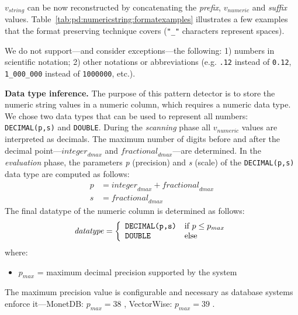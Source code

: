 \(v_{string}\) can be now reconstructed by concatenating the \textit{prefix}, \(v_{numeric}\) and \textit{suffix} values. Table~\ref{tab:pd:numericstring:formatexamples} illustrates a few examples that the format preserving technique covers (\verb|"_"| characters represent spaces).



We do not support---and consider exceptions---the following: 1) numbers in scientific notation; 2) other notations or abbreviations (e.g. \verb|.12| instead of \verb|0.12|, \verb|1_000_000| instead of \verb|1000000|, etc.).

\textbf{Data type inference.} The purpose of this pattern detector is to store the numeric string values in a numeric column, which requires a numeric data type. We chose two data types that can be used to represent all numbers: \verb|DECIMAL(p,s)| and \verb|DOUBLE|. During the \textit{scanning} phase all \(v_{numeric}\) values are interpreted as decimals. The maximum number of digits before and after the decimal point---\(\mathit{integer}_{dmax}\) and \(\mathit{fractional}_{dmax}\)---are determined.  In the \textit{evaluation} phase, the parameters \textit{p} (precision) and \textit{s} (scale) of the \verb|DECIMAL(p,s)| data type are computed as follows:
\begin{equation}
\label{eq:pd:numericstrings:precisionscale}
\begin{array}{ll}
    p &= \mathit{integer}_{dmax} + \mathit{fractional}_{dmax}\\
    s &= \mathit{fractional}_{dmax}
\end{array}
\end{equation}
The final datatype of the numeric column is determined as follows:
\begin{equation}
\label{eq:pd:numericstrings:datatype}
\mathit{datatype} = 
\left\{
\begin{array}{ll}
    \verb|DECIMAL(p,s)| & \mbox{if } p \leq p_{max}\\
    \verb|DOUBLE| & \mbox{else}
\end{array}
\right.
\end{equation}
where:
\begin{itemize}
    \item[] \(p_{max}\) = maximum decimal precision supported by the system
\end{itemize}
The maximum precision value is configurable and necessary as database systems enforce it---MonetDB: \(p_{max}=38\) \cite{monetdbdatatypes}, VectorWise: \(p_{max}=39\) \cite{vectorwisedecimal}.

